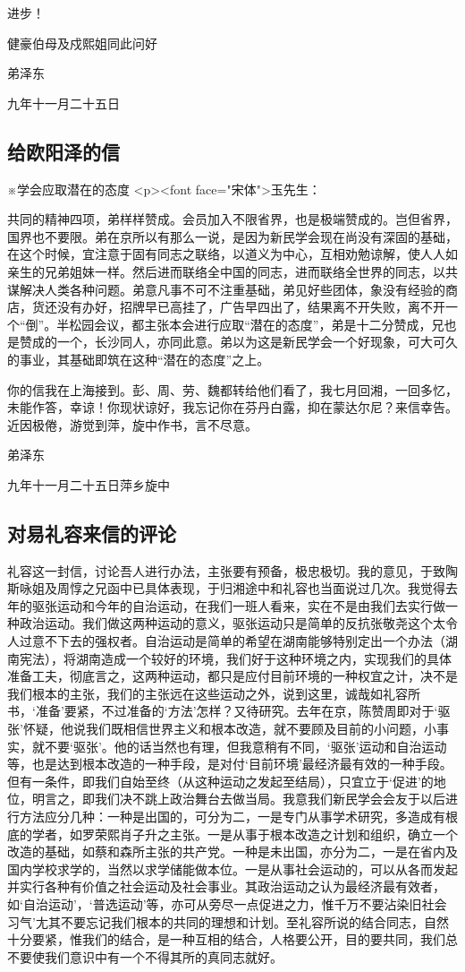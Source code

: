 进步！

健豪伯母及戍熙姐同此问好

 弟泽东

 九年十一月二十五日
\subsection{给欧阳泽的信}

※学会应取潜在的态度
<p><font face="宋体">玉先生：

共同的精神四项，弟样样赞成。会员加入不限省界，也是极端赞成的。岂但省界，国界也不要限。弟在京所以有那么一说，是因为新民学会现在尚没有深固的基础，在这个时候，宜注意于固有同志之联络，以道义为中心，互相劝勉谅解，使人人如亲生的兄弟姐妹一样。然后进而联络全中国的同志，进而联络全世界的同志，以共谋解决人类各种问题。弟意凡事不可不注重基础，弟见好些团体，象没有经验的商店，货还没有办好，招牌早已高挂了，广告早四出了，结果离不开失败，离不开一个“倒”。半松园会议，都主张本会进行应取“潜在的态度”，弟是十二分赞成，兄也是赞成的一个，长沙同人，亦同此意。弟以为这是新民学会一个好现象，可大可久的事业，其基础即筑在这种“潜在的态度”之上。

你的信我在上海接到。彭、周、劳、魏都转给他们看了，我七月回湘，一回多忆，未能作答，幸谅！你现状谅好，我忘记你在芬丹白露，抑在蒙达尔尼？来信幸告。近因极倦，游觉到萍，旋中作书，言不尽意。

 弟泽东

 九年十一月二十五日萍乡旋中
\subsection{对易礼容来信的评论}

礼容这一封信，讨论吾人进行办法，主张要有预备，极忠极切。我的意见，于致陶斯咏姐及周惇之兄函中已具体表现，于归湘途中和礼容也当面说过几次。我觉得去年的驱张运动和今年的自治运动，在我们一班人看来，实在不是由我们去实行做一种政治运动。我们做这两种运动的意义，驱张运动只是简单的反抗张敬尧这个太令人过意不下去的强权者。自治运动是简单的希望在湖南能够特别定出一个办法（湖南宪法），将湖南造成一个较好的环境，我们好于这种环境之内，实现我们的具体准备工夫，彻底言之，这两种运动，都只是应付目前环境的一种权宜之计，决不是我们根本的主张，我们的主张远在这些运动之外，说到这里，诚哉如礼容所书，‘准备’要紧，不过准备的‘方法’怎样？又待研究。去年在京，陈赞周即对于‘驱张’怀疑，他说我们既相信世界主义和根本改造，就不要顾及目前的小问题，小事实，就不要‘驱张’。他的话当然也有理，但我意稍有不同，‘驱张’运动和自治运动等，也是达到根本改造的一种手段，是对付‘目前环境’最经济最有效的一种手段。但有一条件，即我们自始至终（从这种运动之发起至结局），只宜立于‘促进’的地位，明言之，即我们决不跳上政治舞台去做当局。我意我们新民学会会友于以后进行方法应分几种：一种是出国的，可分为二，一是专门从事学术研究，多造成有根底的学者，如罗荣熙肖子升之主张。一是从事于根本改造之计划和组织，确立一个改造的基础，如蔡和森所主张的共产党。一种是未出国，亦分为二，一是在省内及国内学校求学的，当然以求学储能做本位。一是从事社会运动的，可以从各而发起并实行各种有价值之社会运动及社会事业。其政治运动之认为最经济最有效者，如‘自治运动’，‘普选运动’等，亦可从旁尽一点促进之力，惟千万不要沾染旧社会习气’尢其不要忘记我们根本的共同的理想和计划。至礼容所说的结合同志，自然十分要紧，惟我们的结合，是一种互相的结合，人格要公开，目的要共同，我们总不要使我们意识中有一个不得其所的真同志就好。

